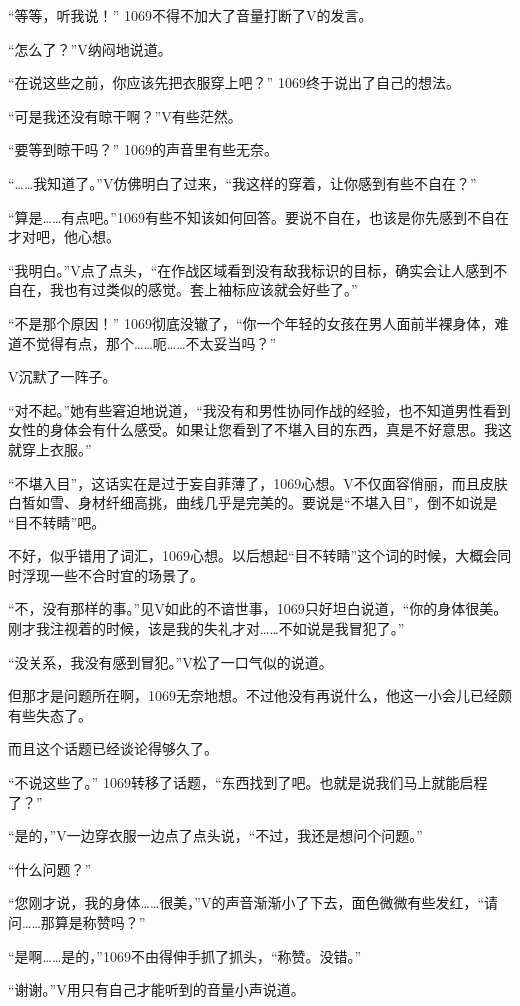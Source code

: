 “等等，听我说！” 1069不得不加大了音量打断了V的发言。

“怎么了？”V纳闷地说道。

“在说这些之前，你应该先把衣服穿上吧？” 1069终于说出了自己的想法。

“可是我还没有晾干啊？”V有些茫然。

“要等到晾干吗？” 1069的声音里有些无奈。

“……我知道了。”V仿佛明白了过来，“我这样的穿着，让你感到有些不自在？”

“算是……有点吧。”1069有些不知该如何回答。要说不自在，也该是你先感到不自在才对吧，他心想。

“我明白。”V点了点头，“在作战区域看到没有敌我标识的目标，确实会让人感到不自在，我也有过类似的感觉。套上袖标应该就会好些了。”

“不是那个原因！” 1069彻底没辙了，“你一个年轻的女孩在男人面前半裸身体，难道不觉得有点，那个……呃……不太妥当吗？”

V沉默了一阵子。

“对不起。”她有些窘迫地说道，“我没有和男性协同作战的经验，也不知道男性看到女性的身体会有什么感受。如果让您看到了不堪入目的东西，真是不好意思。我这就穿上衣服。”

“不堪入目”，这话实在是过于妄自菲薄了，1069心想。V不仅面容俏丽，而且皮肤白皙如雪、身材纤细高挑，曲线几乎是完美的。要说是“不堪入目”，倒不如说是 “目不转睛”吧。

不好，似乎错用了词汇，1069心想。以后想起“目不转睛”这个词的时候，大概会同时浮现一些不合时宜的场景了。

“不，没有那样的事。”见V如此的不谙世事，1069只好坦白说道，“你的身体很美。刚才我注视着的时候，该是我的失礼才对……不如说是我冒犯了。”

“没关系，我没有感到冒犯。”V松了一口气似的说道。

但那才是问题所在啊，1069无奈地想。不过他没有再说什么，他这一小会儿已经颇有些失态了。

而且这个话题已经谈论得够久了。

“不说这些了。” 1069转移了话题，“东西找到了吧。也就是说我们马上就能启程了？”

“是的，”V一边穿衣服一边点了点头说，“不过，我还是想问个问题。”

“什么问题？”

“您刚才说，我的身体……很美，”V的声音渐渐小了下去，面色微微有些发红，“请问……那算是称赞吗？”

“是啊……是的，”1069不由得伸手抓了抓头，“称赞。没错。”

“谢谢。”V用只有自己才能听到的音量小声说道。

